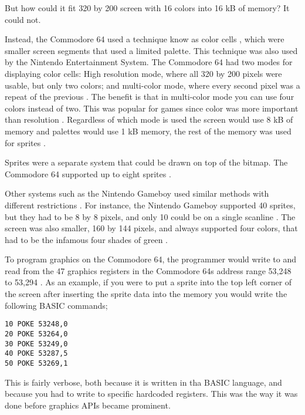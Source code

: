 But how could it fit 320 by 200 screen with 16 colors into 16 kB of memory? It could not.

Instead, the Commodore 64 used a technique know as color cells \cite{commodore1983commodore}, which were smaller screen segments that used a limited palette.
This technique was also used by the Nintendo Entertainment System. 
The Commodore 64 had two modes for displaying color cells: High resolution mode, where all 320 by 200 pixels were usable, but only two colors; and multi-color mode, where every second pixel was a repeat of the previous \cite{commodore1983commodore}.
The benefit is that in multi-color mode you can use four colors instead of two.
This was popular for games since color was more important than resolution \cite{bogdan2014games}.
Regardless of which mode is used the screen would use 8 kB of memory and palettes would use 1 kB memory, the rest of the memory was used for sprites \cite{commodore1983commodore}.

Sprites were a separate system that could be drawn on top of the bitmap.
The Commodore 64 supported up to eight sprites \cite{commodore1983commodore}.

Other systems such as the Nintendo Gameboy used similar methods with different restrictions \cite{nintendo1999gameboy}.
For instance, the Nintendo Gameboy supported 40 sprites, but they had to be 8 by 8 pixels, and only 10 could be on a single scanline \cite{nintendo1999gameboy}. 
The screen was also smaller, 160 by 144 pixels, and always supported four colors, that had to be the infamous four shades of green \cite{nintendo1999gameboy}.

To program graphics on the Commodore 64, the programmer would write to and read from the 47 graphics registers in the Commodore 64s address range 53,248 to 53,294 \cite{commodore1983commodore}.
As an example, if you were to put a sprite into the top left corner of the screen after inserting the sprite data into the memory you would write the following BASIC commands; 

\begin{lstlisting}[caption={Small BASIC program that sets the coordinate of sprite 0 to (0,0) (line 1-3), sets the color to green (line 4), and displays it (line 5).}]
10 POKE 53248,0
20 POKE 53264,0
30 POKE 53249,0
40 POKE 53287,5
50 POKE 53269,1
\end{lstlisting}
This is fairly verbose, both because it is written in tha BASIC language, and because you had to write to specific hardcoded registers.
This was the way it was done before graphics \glspl{API} became prominent.


